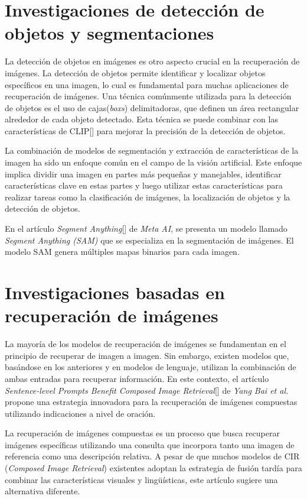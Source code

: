 \section{Investigaciones de detección de objetos y segmentaciones}

La detección de objetos en imágenes es otro aspecto crucial en la recuperación de imágenes. La detección de objetos permite identificar y localizar objetos específicos en una imagen, lo cual es fundamental para muchas aplicaciones de recuperación de imágenes. Una técnica comúnmente utilizada para la detección de objetos es el uso de cajas(\textit{boxs}) delimitadoras, que definen un área rectangular alrededor de cada objeto detectado. Esta técnica se puede combinar con las características de CLIP[\cite{clip}] para mejorar la precisión de la detección de objetos.

La combinación de modelos de segmentación y extracción de características de la imagen ha sido un enfoque común en el campo de la visión artificial. Este enfoque implica dividir una imagen en partes más pequeñas y manejables, identificar características clave en estas partes y luego utilizar estas características para realizar tareas como la clasificación de imágenes, la localización de objetos y la detección de objetos.

En el artículo \textit{Segment Anything}[\cite{sam-paper}] de \textit{Meta AI}, se presenta un modelo llamado \textit{Segment Anything (SAM)} que se especializa en la segmentación de imágenes. El modelo SAM genera múltiples mapas binarios para cada imagen.

\section{Investigaciones basadas en recuperaci\'on de im\'agenes}

La mayoría de los modelos de recuperación de imágenes se fundamentan en el principio de recuperar de imagen a imagen. Sin embargo, existen modelos que, basándose en los anteriores y en modelos de lenguaje, utilizan la combinación de ambas entradas para recuperar información. En este contexto, el artículo \textit{Sentence-level Prompts Benefit Composed Image Retrieval}[\cite{sentence-level}] de \textit{Yang Bai et al.} propone una estrategia innovadora para la recuperación de imágenes compuestas utilizando indicaciones a nivel de oración.

La recuperación de imágenes compuestas es un proceso que busca recuperar imágenes específicas utilizando una consulta que incorpora tanto una imagen de referencia como una descripción relativa. A pesar de que muchos modelos de CIR (\textit{Composed Image Retrieval}) existentes adoptan la estrategia de fusión tardía para combinar las características visuales y lingüísticas, este artículo sugiere una alternativa diferente.

